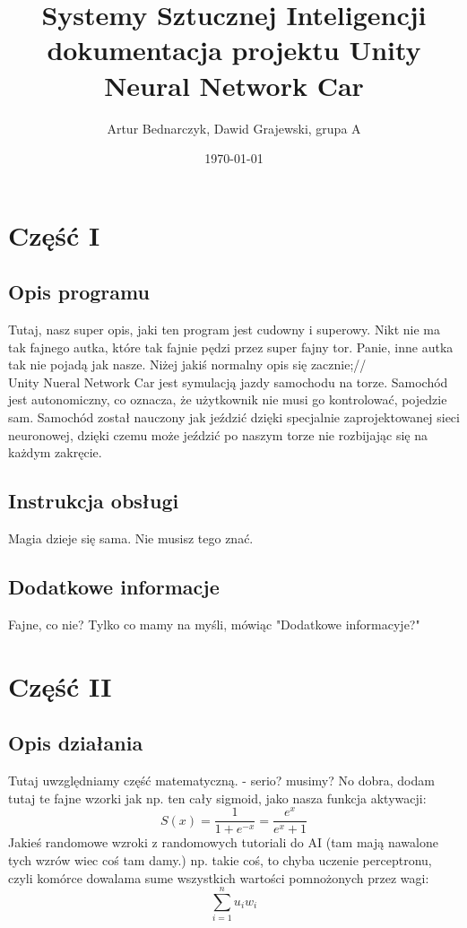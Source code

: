 \documentclass[12pt,a4paper]{article}
\begin{document}
	
	\title{Systemy Sztucznej Inteligencji\\\small{dokumentacja projektu Unity Neural Network Car}}
	\author{Artur Bednarczyk, Dawid Grajewski, grupa A}
	\date{\today}

	\maketitle
	\newpage
	\section*{Część I}
	\subsection*{Opis programu}
	Tutaj, nasz super opis, jaki ten program jest cudowny i superowy. Nikt nie ma tak fajnego autka, które tak fajnie pędzi przez super fajny tor.
	Panie, inne autka tak nie pojadą jak nasze. Niżej jakiś normalny opis się zacznie;// \\
	
	Unity Nueral Network Car jest symulacją jazdy samochodu na torze. Samochód jest autonomiczny, co oznacza, że użytkownik nie musi go kontrolować, pojedzie sam. Samochód został nauczony jak jeździć dzięki specjalnie zaprojektowanej sieci neuronowej, dzięki czemu może jeździć po naszym torze nie rozbijając się na każdym zakręcie.
	\subsection*{Instrukcja obsługi}
	Magia dzieje się sama. Nie musisz tego znać.
	\subsection*{Dodatkowe informacje}
	Fajne, co nie? Tylko co mamy na myśli, mówiąc "Dodatkowe informacyje?"
	\newpage
	\section*{Część II}
	\subsection*{Opis działania} 
	Tutaj uwzględniamy część matematyczną.
	- serio? musimy?
	No dobra, dodam tutaj te fajne wzorki jak np. ten cały sigmoid, jako nasza funkcja aktywacji:
	$$ S(x) = \frac{1}{1+e^{-x}} = \frac{e^x}{e^x+1} $$
	Jakieś randomowe wzroki z randomowych tutoriali do AI (tam mają nawalone tych wzrów wiec coś tam damy.) np. takie coś, to chyba uczenie perceptronu, czyli komórce dowalama sume wszystkich wartości pomnożonych przez wagi:
	$$ \sum_{i=1}^{n}u_iw_i $$
	
\end{document}
